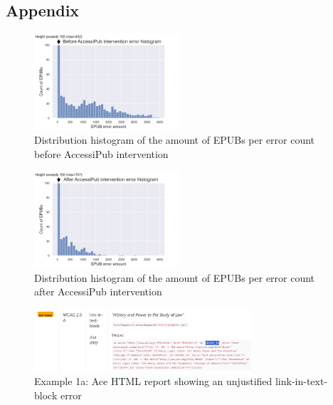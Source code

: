 \onecolumn

\appendix
\begin{appendices}

\section{Appendix}
\label{sec:apx:first_appendix}

\begin{figure}[h]
\includegraphics[width=0.48\textwidth,keepaspectratio]{media/images/preaccessipub.png}
\caption{Distribution histogram of the amount of EPUBs per error count before AccessiPub intervention}
\centering
\label{figure:Appendix_pre}
\end{figure}

\begin{figure}[h]
\includegraphics[width=0.48\textwidth,keepaspectratio]{media/images/postaccessipub.png}
\caption{Distribution histogram of the amount of EPUBs per error count after AccessiPub intervention}
\centering
\label{figure:Appendix_post}
\end{figure}

\begin{figure}[h]
\includegraphics[width=0.72\textwidth,keepaspectratio]{media/images/ace-wrong.png}
\caption{Example 1a: Ace HTML report showing an unjustified link-in-text-block error}
\centering
\label{figure:Appendix_ace-wrong}
\end{figure}


\end{appendices}
